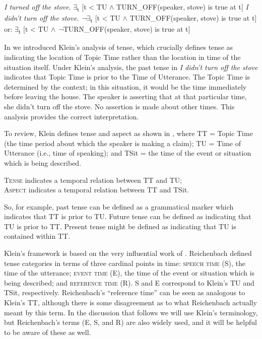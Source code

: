 \ea
\ea  \textit{I turned off the stove}.  ${\exists}$\textsubscript{t} [t < TU $\wedge$ TURN\_OFF(speaker, stove) is true at t]
\ex   \textit{I didn’t turn off the stove}.  \textit{¬}${\exists}$\textsubscript{t} [t < TU $\wedge$ TURN\_OFF(speaker, stove) is true at t]\\
  or:  ${\exists}$\textsubscript{t} [t < TU $\wedge$ \textit{¬}TURN\_OFF(speaker, stove) is true at t]
\z \z

In  we introduced Klein’s analysis of tense, which crucially defines tense as indicating the location of Topic Time rather than the location in time of the situation itself. Under Klein’s analysis, the past tense in  \textit{I didn’t turn off the stove} indicates that Topic Time is prior to the Time of Utterance. The Topic Time is determined by the context; in this situation, it would be the time immediately before leaving the house. The speaker is asserting that at that particular time, she didn’t turn off the stove. No assertion is made about other times. This analysis provides the correct interpretation.


To review, Klein defines tense and aspect as shown in , where TT = Topic Time (the time period about which the speaker is making a claim); TU = Time of Utterance (i.e., time of speaking); and TSit = the time of the event or situation which is being described.


\ea
\ea \textsc{Tense} indicates a temporal relation between TT and TU;\\
\ex \textsc{Aspect} indicates a temporal relation between TT and TSit.
                       \z
\z


So, for example, past tense can be defined as a grammatical marker which indicates that TT is prior to TU. Future tense can be defined as indicating that TU is prior to TT. Present tense might be defined as indicating that TU is contained within TT.



Klein’s framework is based on the very influential work of \citet{Reichenbach1947}. Reichenbach defined tense categories in terms of three cardinal points in time: \textsc{speech time} (S), the time of the utterance; \textsc{event time} (E), the time of the event or situation which is being described; and \textsc{reference time} (R). S and E correspond to Klein’s TU and TSit, respectively. Reichenbach’s “reference time” can be seen as analogous to Klein’s TT, although there is some disagreement as to what Reichenbach actually meant by this term. In the discussion that follows we will use Klein’s terminology, but Reichenbach’s terms (E, S, and R) are also widely used, and it will be helpful to be aware of these as well.



